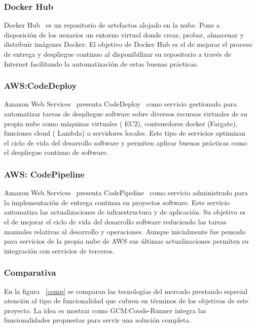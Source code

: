 \documentclass[a4paper,11pt]{book}
\begin{document}
\subsubsection{Docker Hub}

Docker Hub~\cite{dhub} es un repositorio de artefactos alojado en la nube. Pone a disposición de los usuarios un entorno virtual donde crear, probar, almacenar y distribuir imágenes Docker. El objetivo de Docker Hub es el de mejorar el proceso de entrega y despliegue continuo al disponibilizar su repositorio a través de Internet facilitando la automatización de estas buenas prácticas. 

\subsubsection{AWS:CodeDeploy}

Amazon Web Services~\cite{aws} presenta  CodeDeploy~\cite{awscode} como servicio gestionado para automatizar tareas de despliegue software sobre diversos recursos virtuales de su propia nube como máquinas virtuales ( EC2), contenedores docker (Fargate), funciones cloud ( Lambda) o servidores locales. Este tipo de servicios optimizan el ciclo de vida del desarrollo software y permiten aplicar buenas prácticas como el despliegue continuo de software. 

\subsubsection{AWS: CodePipeline}
Amazon Web Services~\cite{aws} presenta  CodePipeline~\cite{awspipe} como servicio administrado para la implementación de entrega continua en proyectos software. Este servicio automatiza las actualizaciones de infraestructura y de aplicación. Su objetivo es el de mejorar el ciclo de vida del desarrollo software reduciendo las tareas manuales relativas al desarrollo y operaciones. Aunque inicialmente fue pensado para servicios de la propia nube de AWS sus últimas actualizaciones permiten su integración con servicios de terceros.  


\subsubsection{Comparativa}

En la figura ~\ref{comp} se comparan las tecnologías del mercado prestando especial atención al tipo de funcionalidad que cubren en términos de los objetivos de este proyecto. La idea es mostrar como GCM:Coode-Runner integra las funcionalidades propuestas para servir una solución completa.
\end{document}
